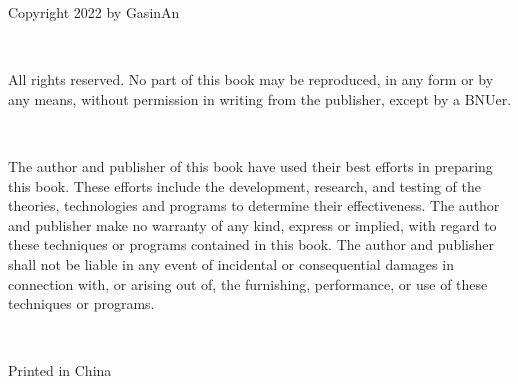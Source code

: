 \noindent Copyright \textcopyright{} 2022 by GasinAn

\ 

\noindent All rights reserved. No part of this book may be reproduced, in any form or by any means, without permission in writing from the publisher, except by a BNUer.

\ 

\noindent The author and publisher of this book have used their best efforts in preparing this book. These efforts include the development, research, and testing of the theories, technologies and programs to determine their effectiveness. The author and publisher make no warranty of any kind, express or implied, with regard to these techniques or programs contained in this book. The author and publisher shall not be liable in any event of incidental or consequential damages in connection with, or arising out of, the furnishing, performance, or use of these techniques or programs.

\ 

\noindent Printed in China

